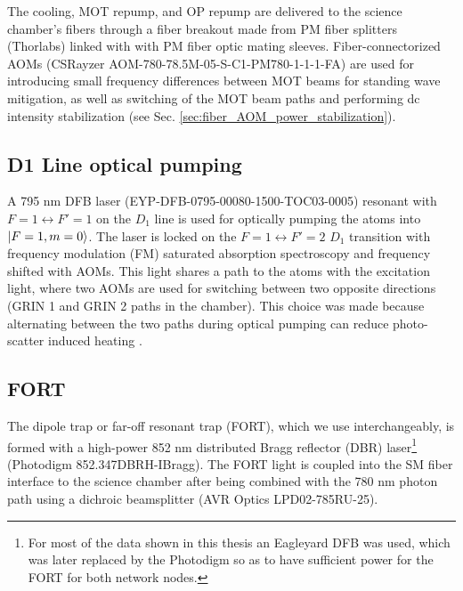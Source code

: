 The cooling, MOT repump, and OP repump are delivered to the science chamber's fibers through a fiber breakout made from PM fiber splitters (Thorlabs) linked with with PM fiber optic mating sleeves. Fiber-connectorized AOMs (CSRayzer AOM-780-78.5M-05-S-C1-PM780-1-1-1-FA) are used for introducing small frequency differences between MOT beams for standing wave mitigation, as well as switching of the MOT beam paths and performing dc intensity stabilization (see Sec. \ref{sec:fiber_AOM_power_stabilization}). 

\subsection{D1 Line optical pumping}

A 795 nm DFB laser (EYP-DFB-0795-00080-1500-TOC03-0005) resonant with $F=1 \leftrightarrow F'=1$ on the $D_1$ line is used for optically pumping the atoms into $\ket{F=1, m=0}$. The laser is locked on the $F=1 \leftrightarrow F'=2$ $D_1$ transition with frequency modulation (FM) saturated absorption spectroscopy and frequency shifted with AOMs. This light shares a path to the atoms with the excitation light, where two AOMs are used for switching between two opposite directions (GRIN 1 and GRIN 2 paths in the chamber). This choice was made  because alternating between the two paths during optical pumping can reduce photo-scatter induced heating \cite{su2024fast}.

\subsection{FORT}
The dipole trap or far-off resonant trap (FORT), which we use interchangeably, is formed with a high-power 852 nm distributed Bragg reflector (DBR) laser\footnote{For most of the data shown in this thesis an Eagleyard DFB was used, which was later replaced by the Photodigm so as to have sufficient power for the FORT for both network nodes.} (Photodigm 852.347DBRH-IBragg). The FORT light is coupled into the SM fiber interface to the science chamber after being combined with the 780 nm photon path using a dichroic beamsplitter (AVR Optics LPD02-785RU-25).  

